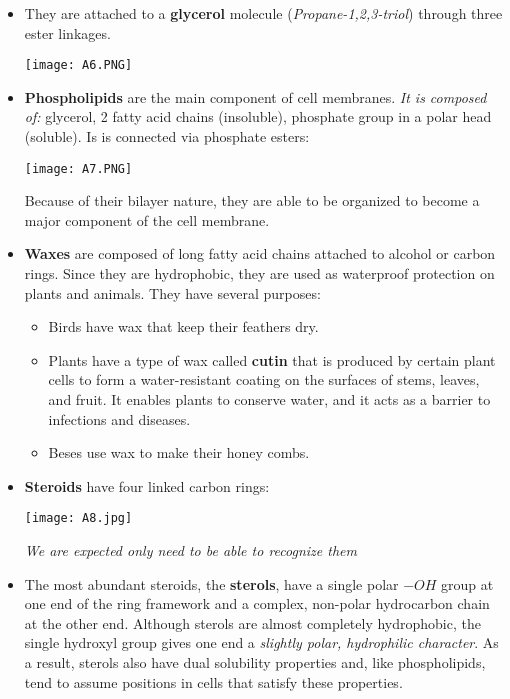 \documentclass[letterpaper]{article}
\begin{document}
\begin{itemize}
    \begin{multicols}{2}
    \begin{itemize}
        \item Monounsaturated: $1$ double bond
        \item Polyunsaturated: $>1$ double bond
    \end{itemize}
    \end{multicols}
    \item They are attached to a \textbf{glycerol} molecule (\textit{Propane-1,2,3-triol}) through three ester linkages.
    \begin{center}\texttt{[image: A6.PNG]}\end{center}
    \item \textbf{Phospholipids} are the main component of cell membranes. \textit{It is composed of:} glycerol, 2 fatty acid chains (insoluble), phosphate group in a polar head (soluble). Is is connected via phosphate esters:
    \begin{center}\texttt{[image: A7.PNG]}\end{center}
    Because of their bilayer nature, they are able to be organized to become a major component of the cell membrane.
    \item \textbf{Waxes} are composed of long fatty acid chains attached
    to alcohol or carbon rings. Since they are hydrophobic, they are used as waterproof protection on plants and animals. They have several purposes:
    \begin{itemize}
        \item Birds have wax that keep their feathers dry.
        \item Plants have a type of wax called \textbf{cutin} that is produced by certain plant cells to form a water-resistant coating on the surfaces of stems, leaves, and fruit. It enables plants to conserve water, and it acts as a barrier to infections and diseases.
        \item Beses use wax to make their honey combs.
    \end{itemize}
    \item \textbf{Steroids} have four linked carbon rings:
    \begin{center}\texttt{[image: A8.jpg]}\end{center}
    \textit{We are expected only need to be able to recognize them} 
    \item The most abundant steroids, the \textbf{sterols}, have a single polar $-OH$ group at one end of the ring framework and a complex, non-polar hydrocarbon chain at the other end. Although sterols are almost completely hydrophobic, the single hydroxyl group gives one end a \textit{slightly polar, hydrophilic character}. As a result, sterols also have dual solubility properties and, like phospholipids, tend to assume positions in cells that satisfy these properties.

\end{itemize}
\end{document}
